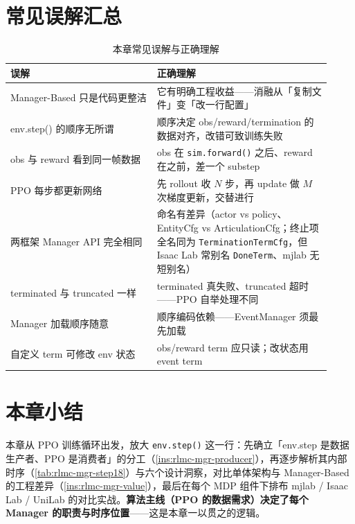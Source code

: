 \section*{常见误解汇总}
\label{sec:rlmc-mgr-misconceptions}

\begin{table}[H]
\centering
\caption{本章常见误解与正确理解}
\label{tab:rlmc-mgr-misc}
\small
\begin{tabular}{@{}p{0.42\linewidth}p{0.5\linewidth}@{}}
\toprule
误解 & 正确理解 \\
\midrule
Manager-Based 只是代码更整洁 & 它有明确工程收益——消融从「复制文件」变「改一行配置」 \\
env.step() 的顺序无所谓 & 顺序决定 obs/reward/termination 的数据对齐，改错可致训练失败 \\
obs 与 reward 看到同一帧数据 & obs 在 \verb|sim.forward()| 之后、reward 在之前，差一个 substep \\
PPO 每步都更新网络 & 先 rollout 收 $N$ 步，再 update 做 $M$ 次梯度更新，交替进行 \\
两框架 Manager API 完全相同 & 命名有差异（actor vs policy、EntityCfg vs ArticulationCfg；终止项全名同为 \texttt{TerminationTermCfg}，但 Isaac Lab 常别名 \texttt{DoneTerm}、mjlab 无短别名） \\
terminated 与 truncated 一样 & terminated 真失败、truncated 超时——PPO 自举处理不同 \\
Manager 加载顺序随意 & 顺序编码依赖——EventManager 须最先加载 \\
自定义 term 可修改 env 状态 & obs/reward term 应只读；改状态用 event term \\
\bottomrule
\end{tabular}
\end{table}

\section*{本章小结}
\label{sec:rlmc-mgr-summary}

本章从 PPO 训练循环出发，放大 \verb|env.step()| 这一行：先确立「env.step 是数据生产者、PPO 是消费者」的分工（\cref{ins:rlmc-mgr-producer}），再逐步解析其内部时序（\cref{tab:rlmc-mgr-step18}）与六个设计洞察，对比单体架构与 Manager-Based 的工程差异（\cref{ins:rlmc-mgr-value}），最后在每个 MDP 组件下排布 mjlab / Isaac Lab / UniLab 的对比实战。\textbf{算法主线（PPO 的数据需求）决定了每个 Manager 的职责与时序位置}——这是本章一以贯之的逻辑。

